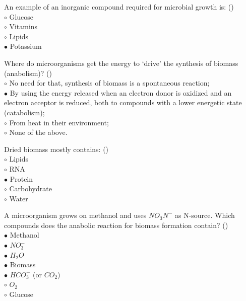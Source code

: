 \documentclass[]{beamer}
\begin{document}
\begin{frame}[shrink] {}
\addtocounter{questions}{1}
\color{blue}
An example of an inorganic compound required for microbial growth is:  ()\\
\color{black}
\setlength{\parindent}{-0.4cm}
{\color{red}$\circ$}  Glucose\\
{\color{red}$\circ$} Vitamins\\
{\color{red}$\circ$} Lipids\\
{\color{red}$\bullet$} Potassium \\
\end{frame}

\begin{frame}[shrink] {}
\addtocounter{questions}{1}
\color{blue}
Where do microorganisms get the energy to ‘drive’ the synthesis of biomass (anabolism)?  ()\\
\color{black}
\setlength{\parindent}{-0.4cm}
{\color{red}$\circ$}  No need for that, synthesis of biomass is a spontaneous reaction;\\
{\color{red}$\bullet$} By using the energy released when an electron donor is oxidized and an electron acceptor is reduced, both to compounds with a lower energetic state (catabolism);\\
{\color{red}$\circ$} From heat in their environment;\\
{\color{red}$\circ$} None of the above. \\
\end{frame}

\begin{frame}[shrink] {}
\addtocounter{questions}{1}
\color{blue}
Dried biomass mostly contains:  ()\\
\color{black}
\setlength{\parindent}{-0.4cm}
{\color{red}$\circ$} Lipids\\
{\color{red}$\circ$} RNA\\
{\color{red}$\bullet$}  Protein \\
{\color{red}$\circ$} Carbohydrate\\
{\color{red}$\circ$} Water \\
\end{frame}

\begin{frame}[shrink] {}
\addtocounter{questions}{1}
\color{blue}
A microorganism grows on methanol and uses $NO_{3}N^{-}$ as N-source. Which compounds does the anabolic reaction for biomass formation contain?   ()\\
\color{black}
\setlength{\parindent}{-0.4cm}
{\color{red}$\bullet$}  Methanol\\
{\color{red}$\bullet$} $NO_{3}^{-}$\\
{\color{red}$\bullet$} ${H_{2}O}$\\
{\color{red}$\bullet$} Biomass\\
{\color{red}$\bullet$} $HCO_{3}^{-}$ (or $CO_2$)\\
{\color{red}$\circ$} $O_2$\\
{\color{red}$\circ$} Glucose \\
\end{frame}
\end{document}

